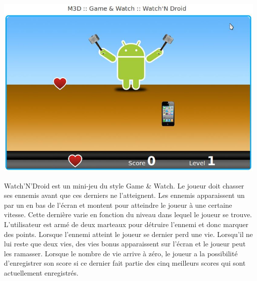 \begin{minipage}{6cm}
 \includegraphics[width=\linewidth]{img/capturejeu_watchndroid}
\end{minipage}
\hfill
\begin{minipage}{9cm}
Watch’N’Droid est un mini-jeu du style Game \& Watch. 
Le joueur doit chasser ses ennemis avant que ces derniers ne l’atteignent. 
Les ennemis apparaissent un par un en bas de l’écran et montent pour atteindre le joueur à une certaine vitesse.
Cette dernière varie en fonction du niveau dans lequel le joueur se trouve. 
L’utilisateur est armé de deux marteaux pour détruire l’ennemi et donc marquer des points. 
Lorsque l’ennemi atteint le joueur se dernier perd une vie.
Lorsqu’il ne lui reste que deux vies, des vies bonus apparaissent sur l’écran et le joueur peut les ramasser. 
Lorsque le nombre de vie arrive à zéro, le joueur a la possibilité d’enregistrer son score si ce dernier fait partie
 des cinq meilleurs scores qui sont actuellement enregistrés.
\end{minipage}

